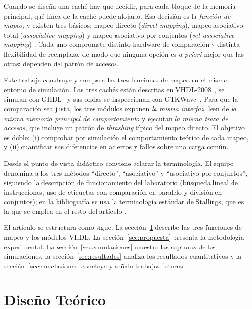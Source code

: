 \documentclass[llncs]{llncs}
\begin{document}
Cuando se diseña una caché hay que decidir, para cada bloque de la
memoria principal, qué línea de la caché puede alojarlo. Esa decisión
es la \emph{función de mapeo}, y existen tres básicos: mapeo directo
(\emph{direct mapping}), mapeo asociativo total (\emph{associative
mapping}) y mapeo asociativo por conjuntos (\emph{set-associative
mapping})
\cite{stallings2019,wikipedia-cache,null2024}. Cada uno compromete
distinto hardware de comparación y distinta flexibilidad de
reemplazo, de modo que ninguna opción es \emph{a priori} mejor que
las otras: dependen del patrón de accesos.

Este trabajo construye y compara las tres funciones de mapeo en el
mismo entorno de simulación. Las tres cachés están descritas en
VHDL-2008~\cite{ieee1076}, se simulan con GHDL~\cite{ghdl-docs} y sus ondas
se
inspeccionan con GTKWave~\cite{gtkwave-docs}. Para que la comparación
sea justa, los tres módulos exponen \emph{la misma interfaz}, leen de
\emph{la misma memoria principal de comportamiento} y ejecutan
\emph{la misma traza de accesos}, que incluye un patrón de
\emph{thrashing} típico del mapeo directo. El objetivo es doble:
(i) comprobar por simulación el comportamiento teórico de cada
mapeo, y (ii) cuantificar sus diferencias en aciertos y fallos sobre
una carga común.

Desde el punto de vista didáctico conviene aclarar la terminología. El
equipo denomina a los tres métodos ``directo'', ``asociativo'' y
``asociativo por conjuntos'', siguiendo la descripción de funcionamiento
del laboratorio (búsqueda lineal de instrucciones, uso de etiquetas
con comparación en paralelo y división en conjuntos); en la
bibliografía se usa la terminología estándar de Stallings, que es la
que se emplea en el resto del artículo \cite{stallings2019}.

El artículo se estructura como sigue. La sección~\ref{sec:diseno}
describe las tres funciones de mapeo y los módulos VHDL. La
sección~\ref{sec:propuesta} presenta la metodología experimental. La
sección~\ref{sec:simulaciones} muestra las capturas de las
simulaciones, la sección~\ref{sec:resultados} analiza los resultados
cuantitativos y la sección~\ref{sec:conclusiones} concluye y señala
trabajos futuros.

\section{Diseño Teórico}
\label{sec:diseno}
\end{document}
